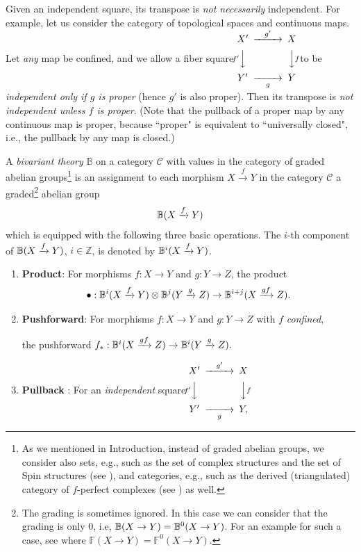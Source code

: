 \documentclass[a4paper]{amsart}
\begin{document}
\begin{rem}Given an independent square, 
its transpose is \emph{not necessarily} independent. For example, let us consider the category of topological spaces and continuous maps. Let \emph{any} map be confined, and we allow a fiber square
\quad $\CD
X' @> {g'} >> X \\
@V {f'}VV @VV {f}V\\
Y' @>> {g} > Y \endCD
$ \quad 
to be \emph{independent only if $g$ is proper} (hence $g'$ is also proper). Then its transpose is \emph{not independent unless 
$f$ is proper}. (Note that the pullback of a proper map by any continuous map is proper, because ``proper" is equivalent to ``universally closed", i.e., the pullback by any map is closed.)
\end{rem}
\begin{def}\label{BivariantTheory}
A \emph{bivariant theory} $\mathbb B$ on a category $\mathscr C$ with values in the category of graded abelian groups\footnote{As we mentioned in Introduction, instead of graded abelian groups, we consider also sets, e.g., such as the set of complex structures and the set of Spin structures (see \cite[\S 4.3.2]{FM}),  and categories, e.g., such as the derived (triangulated) category of $f$-perfect complexes (see \cite[\S 7.1 Grothendieck duality]{FM}) as well.}
 is an assignment to each morphism
$ X  \xrightarrow{f} Y$
in the category $\mathscr C$ a graded\footnote{The grading is sometimes ignored. In this case we can consider that the grading is only $0$, i.e, $\mathbb B(X \to Y) = \mathbb B^0(X \to Y)$. For an example for such a case, see \cite[\S 6.1.2 \underline{Definition of} of $\mathbb F$]{FM} where $\mathbb F(X \to Y) = \mathbb F^0(X \to Y)$.}
abelian group $$\mathbb B(X  \xrightarrow{f} Y)$$
which is equipped with the following three basic operations. The $i$-th component of $\mathbb B(X  \xrightarrow{f} Y)$, $i \in \mathbb Z$, is denoted by $\mathbb B^i(X  \xrightarrow{f} Y)$.
\begin{enumerate}
\item {\bf Product}: For morphisms $f: X \to Y$ and $g: Y
\to Z$, the product 
$$\bullet: \mathbb B^i( X  \xrightarrow{f}  Y) \otimes \mathbb B^j( Y  \xrightarrow{g}  Z) \to
\mathbb B^{i+j}( X  \xrightarrow{gf}  Z).$$
\item {\bf Pushforward}: For morphisms $f: X \to Y$
and $g: Y \to Z$ with $f$ \emph {confined}, 

the pushforward 
$f_*: \mathbb B^i( X  \xrightarrow{gf} Z) \to \mathbb B^i( Y  \xrightarrow{g}  Z).$
\item {\bf Pullback} : For an \emph{independent} square \qquad $\CD
X' @> g' >> X \\
@V f' VV @VV f V\\
Y' @>> g > Y, \endCD
$


\end{enumerate}
\end{def}
\end{document}

